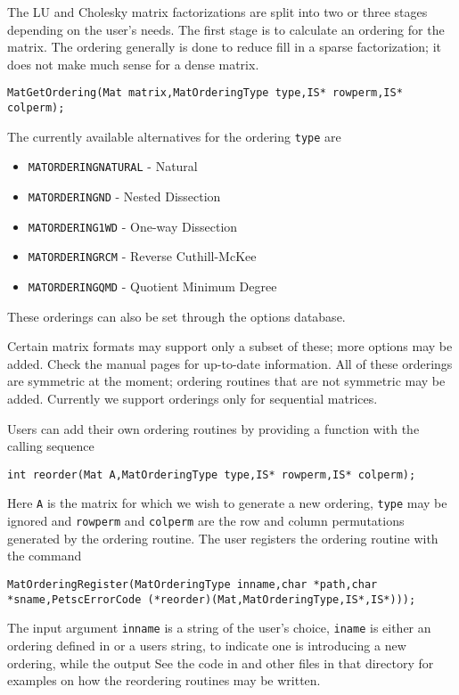 {{The LU and Cholesky 
matrix factorizations are split into 
two or three stages depending on the user's needs. The first stage is
to calculate an ordering for the matrix.  The ordering generally is
done to reduce fill in a sparse factorization; it does not make much
sense for a dense matrix.  
\begin{lstlisting}
MatGetOrdering(Mat matrix,MatOrderingType type,IS* rowperm,IS* colperm);
\end{lstlisting}
The currently available alternatives for the ordering \lstinline{type} are
\begin{itemize}
\item \lstinline{MATORDERINGNATURAL} - Natural
\item \lstinline{MATORDERINGND} - Nested Dissection
\item \lstinline{MATORDERING1WD} - One-way Dissection
\item \lstinline{MATORDERINGRCM} - Reverse Cuthill-McKee
\item \lstinline{MATORDERINGQMD} - Quotient Minimum Degree
\end{itemize}
These orderings can also be set through the options database.

Certain matrix formats may support only a subset of these; more options may
be added. Check the manual pages for up-to-date information. All of these orderings are
symmetric at the moment; ordering routines that are
not symmetric may be added. Currently we support orderings only for
sequential matrices.

Users can add their own ordering routines
by providing a function with the calling sequence
\begin{lstlisting}
int reorder(Mat A,MatOrderingType type,IS* rowperm,IS* colperm);
\end{lstlisting}
Here \lstinline{A} is the matrix for which we wish to generate a new ordering,
\lstinline{type} may be ignored and \lstinline{rowperm} and \lstinline{colperm} are the row
and column permutations generated by the ordering routine.
The user registers the ordering routine
with the command
\begin{lstlisting}
MatOrderingRegister(MatOrderingType inname,char *path,char *sname,PetscErrorCode (*reorder)(Mat,MatOrderingType,IS*,IS*)));
\end{lstlisting}
The  
input argument \lstinline{inname} is a string of the user's choice, \lstinline{iname} is either
an ordering defined in  or a users string,
to indicate one is introducing a new ordering, while the output
See the code in  and other files in that
directory for examples on how the reordering routines may be written.

}}
